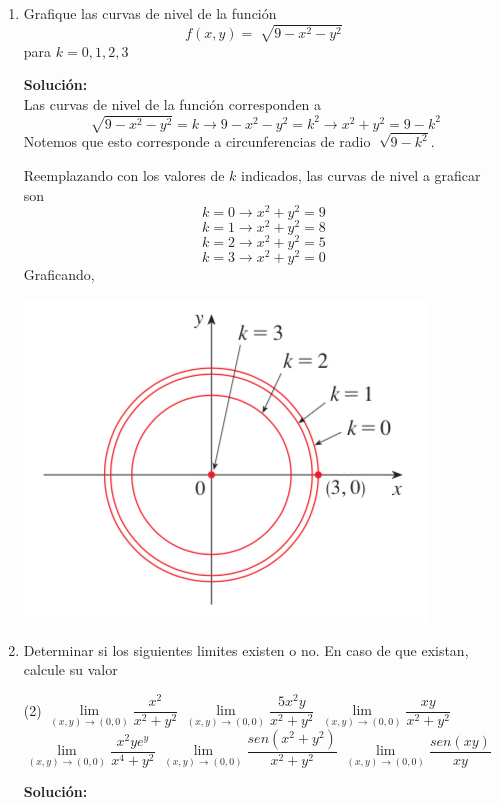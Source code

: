 \documentclass[12pt]{article}
\newenvironment{solucion}
{\begin{mdframed}[backgroundcolor=black!10]
		{\bf Solución:}\\
	}
	{
	\end{mdframed}
}
\newenvironment{preguntas}
{\begin{enumerate}\itemsep12pt
	}
	{
	\end{enumerate}
}
\newcommand{\ra}{\rightarrow}
\begin{document}
\begin{preguntas}
\begin{solucion}
\begin{enumerate}[a)]
Luego, el recorrido será
$$Rec(f) = [3, \infty)$$
\item $f(x,y,z) = \ln(\sqrt[]{x^2+y^2+4}) + z^2$\\
\\
El valor de la raiz que se encuentra dentro del logaritmo será a lo menos 2, ya que los primeros dos terminos pueden tomar mínimo 0 y luego quedará el 4. Luego, el mínimo valor del logaritmo será $\ln(2)$.\\
\\
Por otro lado, $z^2$ será a lo menos 0, con lo que el recorrido que nos queda es
$$Rec(f) = [\ln(2), \infty)$$
\end{enumerate}
\end{solucion}
\item Grafique las curvas de nivel de la función 
	$$ f(x,y) = \sqrt[]{9-x^2-y^2}$$
	para $k=0,1,2,3$
\begin{solucion}

		Las curvas de nivel de la función corresponden a
		$$\sqrt[]{9-x^2-y^2} = k \ra 9-x^2-y^2 = k^2 \ra x^2+y^2 = 9-k^2$$
		Notemos que esto corresponde a circunferencias de radio $\sqrt[]{9-k^2}$.
		
		Reemplazando con los valores de $k$ indicados, las curvas de nivel a graficar son
		$$k = 0 \ra x^2+y^2 = 9$$
		$$k = 1 \ra x^2+y^2 = 8$$
		$$k = 2 \ra x^2+y^2 = 5$$
		$$k = 3 \ra x^2+y^2 = 0$$
		Graficando,
		
		\begin{center}
			\includegraphics[scale=0.4]{../../../../img/curvasdenivel}			
		\end{center}
\end{solucion}
\item Determinar si los siguientes limites existen o no. En caso de que existan, calcule su valor
\begin{tasks}(2)
\task $\lim\limits_{(x,y) \to (0,0)} \dfrac{x^2}{x^2+y^2}$
\task $\lim\limits_{(x,y) \to (0,0)} \dfrac{5x^2y}{x^2+y^2}$
\task $\lim\limits_{(x,y) \to (0,0)} \dfrac{xy}{x^2+y^2}$
\task $\lim\limits_{(x,y) \to (0,0)} \dfrac{x^2ye^y}{x^4+y^2}$
\task $\lim\limits_{(x,y) \to (0,0)} \dfrac{sen(x^2+y^2)}{x^2+y^2}$
\task $\lim\limits_{(x,y) \to (0,0)} \dfrac{sen(xy)}{xy}$
\end{tasks}
\begin{solucion}


\end{solucion}
\end{preguntas}
\end{document}
